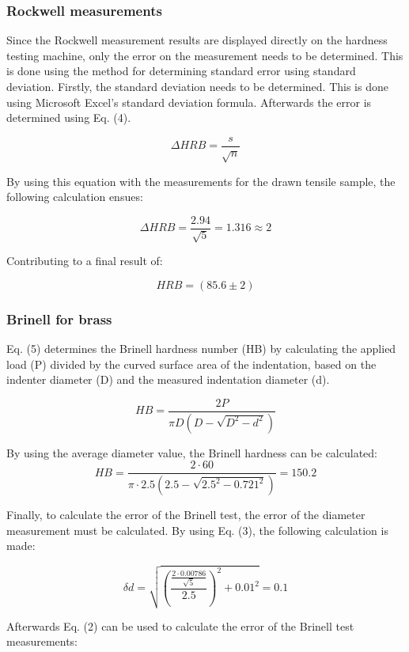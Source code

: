 \documentclass[a4paper]{article}
\begin{document}
\subsubsection{Rockwell measurements}
Since the Rockwell measurement results are displayed directly on the hardness
testing machine, only the error on the measurement needs to be determined. This
is done using the method for determining standard error using standard
deviation\cite{DeneyerUncertainty}. Firstly, the standard deviation needs to be determined. This is
done using Microsoft Excel's standard deviation formula. Afterwards the error is
determined using Eq. (4).

\begin{equation}
  \Delta HRB = \frac{s}{\sqrt{n}}
\end{equation}

By using this equation with the measurements for the drawn tensile sample, the
following calculation ensues:

\[ \Delta HRB = \frac{2.94}{\sqrt{5}} = 1.316 \approx 2\]

Contributing to a final result of:

\[ HRB = (85.6 \pm 2)\]

\subsubsection{Brinell for brass}
Eq. (5) determines the Brinell hardness number (HB) by calculating the applied
load (P) divided by the curved surface area of the indentation, based on the
indenter diameter (D) and the measured indentation diameter (d)\cite{LoeckxHardness}.

\begin{equation}
  HB = \frac{2P}{\pi D(D-\sqrt{D^2 - d^2})}
\end{equation}

By using the average diameter value, the Brinell hardness can be calculated:
\[ HB = \frac{2\cdot 60}{\pi \cdot 2.5(2.5 - \sqrt{2.5^2 - 0.721^2})} = 150.2\]

Finally, to calculate the error of the Brinell test, the error of the diameter
measurement must be calculated. By using Eq. (3), the following calculation
is made:

\[\delta d = \sqrt{\left( \frac{\frac{2 \cdot 0.00786
}{\sqrt{5}}}{2.5} \right )^2 + 0.01^2} = 0.1\]

Afterwards Eq. (2) can be used to calculate the error of the Brinell test
measurements:
\end{document}
